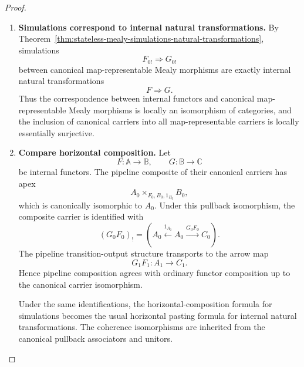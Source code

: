 \begin{proof}
\begin{enumerate}
        The two state maps \(p\) and \(p^{-1}\) are inverse. Since both
        simulations have identity output-comparison components, their vertical
        composites also have identity output comparisons. Hence the two strict
        simulations are mutually inverse.

        Therefore every map-representable Mealy morphism is isomorphic in its
        Mealy hom-category to a canonical one arising from an internal
        functor.

        \item \textbf{Simulations correspond to internal natural
        transformations.}
        By
        Theorem~\ref{thm:stateless-mealy-simulations-natural-transformations},
        simulations
        \[
            F_{0!}\Rightarrow G_{0!}
        \]
        between canonical map-representable Mealy morphisms are exactly
        internal natural transformations
        \[
            F\Rightarrow G.
        \]
        Thus the correspondence between internal functors and canonical
        map-representable Mealy morphisms is locally an isomorphism of
        categories, and the inclusion of canonical carriers into all
        map-representable carriers is locally essentially surjective.

        \item \textbf{Compare horizontal composition.}
        Let
        \[
            F:\mathbb A\to\mathbb B,
            \qquad
            G:\mathbb B\to\mathbb C
        \]
        be internal functors. The pipeline composite of their canonical
        carriers has apex
        \[
            A_0\times_{F_0,B_0,1_{B_0}}B_0,
        \]
        which is canonically isomorphic to \(A_0\). Under this pullback
        isomorphism, the composite carrier is identified with
        \[
            (G_0F_0)_!
            =
            \left(
                A_0
                \xleftarrow{1_{A_0}}
                A_0
                \xrightarrow{G_0F_0}
                C_0
            \right).
        \]
        The pipeline transition-output structure transports to the arrow map
        \[
            G_1F_1:A_1\to C_1.
        \]
        Hence pipeline composition agrees with ordinary functor composition
        up to the canonical carrier isomorphism.

        Under the same identifications, the horizontal-composition formula
        for simulations becomes the usual horizontal pasting formula for
        internal natural transformations. The coherence isomorphisms are
        inherited from the canonical pullback associators and unitors.


\end{enumerate}
\end{proof}
